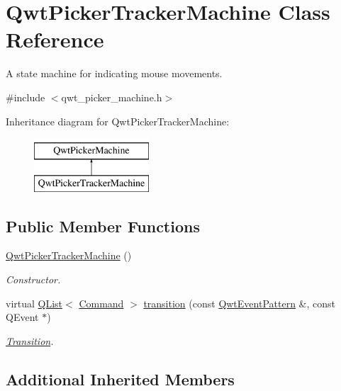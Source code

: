 \hypertarget{class_qwt_picker_tracker_machine}{\section{Qwt\-Picker\-Tracker\-Machine Class Reference}
\label{class_qwt_picker_tracker_machine}
}


A state machine for indicating mouse movements.  




{\ttfamily \#include $<$qwt\-\_\-picker\-\_\-machine.\-h$>$}

Inheritance diagram for Qwt\-Picker\-Tracker\-Machine\-:\begin{figure}[H]
\begin{center}
\leavevmode
\includegraphics[height=2.000000cm]{class_qwt_picker_tracker_machine}
\end{center}
\end{figure}
\subsection*{Public Member Functions}
\begin{DoxyCompactItemize}
\item 
\hyperlink{class_qwt_picker_tracker_machine_a730ee0927456e192f777c225277b3fe0}{Qwt\-Picker\-Tracker\-Machine} ()
\begin{DoxyCompactList}\small\item\em Constructor. \end{DoxyCompactList}\item 
virtual \hyperlink{class_q_list}{Q\-List}$<$ \hyperlink{class_qwt_picker_machine_a3a8d3d4c107ce5f8351e4cbdd38c43f7}{Command} $>$ \hyperlink{class_qwt_picker_tracker_machine_a77f580a0ebcb019028db9565ca6148b9}{transition} (const \hyperlink{class_qwt_event_pattern}{Qwt\-Event\-Pattern} \&, const Q\-Event $\ast$)
\begin{DoxyCompactList}\small\item\em \hyperlink{class_transition}{Transition}. \end{DoxyCompactList}\end{DoxyCompactItemize}
\subsection*{Additional Inherited Members}


